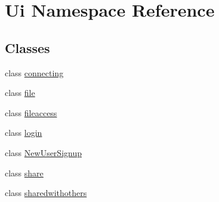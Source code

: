 \hypertarget{namespaceUi}{\section{Ui Namespace Reference}
\label{namespaceUi}
}
\subsection*{Classes}
\begin{DoxyCompactItemize}
\item 
class \hyperlink{classUi_1_1connecting}{connecting}
\item 
class \hyperlink{classUi_1_1file}{file}
\item 
class \hyperlink{classUi_1_1fileaccess}{fileaccess}
\item 
class \hyperlink{classUi_1_1login}{login}
\item 
class \hyperlink{classUi_1_1NewUserSignup}{New\-User\-Signup}
\item 
class \hyperlink{classUi_1_1share}{share}
\item 
class \hyperlink{classUi_1_1sharedwithothers}{sharedwithothers}
\end{DoxyCompactItemize}

